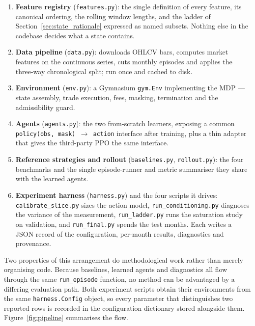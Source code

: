 \begin{enumerate}
  \item \textbf{Feature registry} (\texttt{features.py}): the single
        definition of every feature, its canonical ordering, the rolling
        window lengths, and the ladder of Section~\ref{sec:state_rationale}
        expressed as named subsets. Nothing else in the codebase decides
        what a state contains.
  \item \textbf{Data pipeline} (\texttt{data.py}): downloads OHLCV bars,
        computes market features on the continuous series, cuts monthly
        episodes and applies the three-way chronological split; run once and
        cached to disk.
  \item \textbf{Environment} (\texttt{env.py}): a Gymnasium
        \texttt{gym.Env} implementing the MDP --- state assembly, trade
        execution, fees, masking, termination and the admissibility guard.
  \item \textbf{Agents} (\texttt{agents.py}): the two from-scratch
        learners, exposing a common
        \texttt{policy(obs, mask) $\to$ action} interface after training,
        plus a thin adapter that gives the third-party PPO the same
        interface.
  \item \textbf{Reference strategies and rollout}
        (\texttt{baselines.py}, \texttt{rollout.py}): the four benchmarks
        and the single episode-runner and metric summariser they share with
        the learned agents.
  \item \textbf{Experiment harness} (\texttt{harness.py}) and the four
        scripts it drives: \texttt{calibrate\_slice.py} sizes the action
        model, \texttt{run\_conditioning.py} diagnoses the variance of the
        measurement, \texttt{run\_ladder.py} runs the saturation study on
        validation, and \texttt{run\_final.py} spends the test months. Each
        writes a JSON record of the configuration, per-month results,
        diagnostics and provenance.
\end{enumerate}

Two properties of this arrangement do methodological work rather than
merely organising code. Because baselines, learned agents and diagnostics
all flow through the same \texttt{run\_episode} function, no method can be
advantaged by a differing evaluation path. Both experiment
scripts obtain their environments from the same \texttt{harness.Config}
object, so every parameter that distinguishes two reported rows is
recorded in the configuration dictionary stored alongside them.
Figure~\ref{fig:pipeline} summarises the flow.

